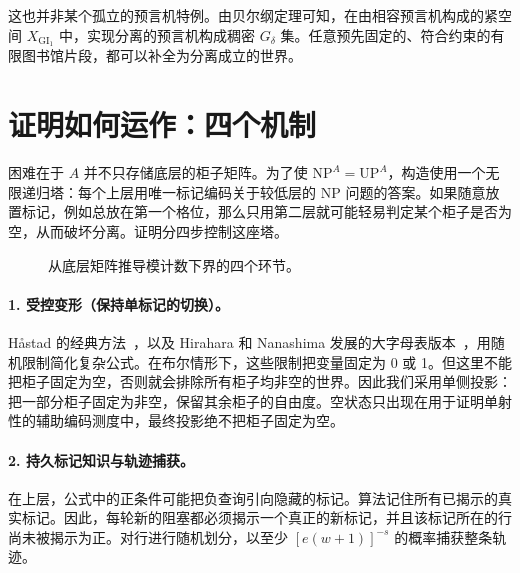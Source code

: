 \documentclass[11pt,a4paper]{article}
\newcommand{\NP}{\mathrm{NP}}
\newcommand{\UP}{\mathrm{UP}}
\newcommand{\GI}{\mathrm{GI}_1}
\begin{document}
这也并非某个孤立的预言机特例。由贝尔纲定理可知，在由相容预言机构成的紧空间 $X_{\GI}$ 中，实现分离的预言机构成稠密 $G_\delta$ 集。任意预先固定的、符合约束的有限图书馆片段，都可以补全为分离成立的世界。

\section{证明如何运作：四个机制}
困难在于 $A$ 并不只存储底层的柜子矩阵。为了使 $\NP^A=\UP^A$，构造使用一个无限递归塔：每个上层用唯一标记编码关于较低层的 $\NP$ 问题的答案。如果随意放置标记，例如总放在第一个格位，那么只用第二层就可能轻易判定某个柜子是否为空，从而破坏分离。证明分四步控制这座塔。

\begin{figure}[htbp]\centering
{}
\caption{从底层矩阵推导模计数下界的四个环节。}
\end{figure}

\paragraph{1. 受控变形（保持单标记的切换）。}
H\aa stad 的经典方法~\cite{hastad}，以及 Hirahara 和 Nanashima 发展的大字母表版本~\cite{hirahara}，用随机限制简化复杂公式。在布尔情形下，这些限制把变量固定为 0 或 1。但这里不能把柜子固定为空，否则就会排除所有柜子均非空的世界。因此我们采用单侧投影：把一部分柜子固定为非空，保留其余柜子的自由度。空状态只出现在用于证明单射性的辅助编码测度中，最终投影绝不把柜子固定为空。

\paragraph{2. 持久标记知识与轨迹捕获。}
在上层，公式中的正条件可能把负查询引向隐藏的标记。算法记住所有已揭示的真实标记。因此，每轮新的阻塞都必须揭示一个真正的新标记，并且该标记所在的行尚未被揭示为正。对行进行随机划分，以至少 $[e(w+1)]^{-s}$ 的概率捕获整条轨迹。
\end{document}

